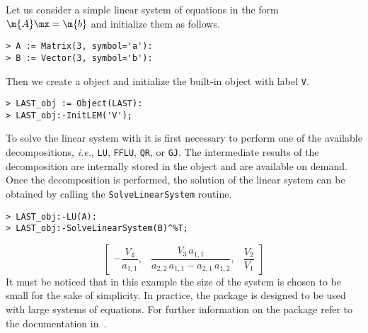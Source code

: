 Let us consider a simple linear system of equations in the form $\m{A}\mx = \m{b}$ and initialize them as follows.
%
\begin{verbatim}
> A := Matrix(3, symbol='a'):
> B := Vector(3, symbol='b'):
\end{verbatim}
%
Then we create a \LAST{} object and initialize the built-in \LEM{} object with label \texttt{V}.
%
\begin{verbatim}
> LAST_obj := Object(LAST):
> LAST_obj:-InitLEM('V');
\end{verbatim}
%
To solve the linear system with \LAST{} it is first necessary to perform one of the available decompositions, \emph{i.e.}, \texttt{LU}, \texttt{FFLU}, \texttt{QR}, or \texttt{GJ}. The intermediate results of the decomposition are internally stored in the \LAST{} object and are available on demand. Once the decomposition is performed, the solution of the linear system can be obtained by calling the \texttt{SolveLinearSystem} routine.
%
\begin{verbatim}
> LAST_obj:-LU(A):
> LAST_obj:-SolveLinearSystem(B)^%T;
\end{verbatim}
\begin{equation*}
    \begin{bmatrix}
        -\dfrac{V_{4}}{a_{1,1}}, &
        \dfrac{V_{3} \, a_{1,1}}{a_{2,2} \, a_{1,1}-a_{2,1} \, a_{1,2}}, &
        \dfrac{V_{2}}{V_{1}}
    \end{bmatrix}
\end{equation*}
%
It must be noticed that in this example the size of the system is chosen to be small for the sake of simplicity. In practice, the \LAST{} package is designed to be used with large systems of equations. For further information on the \LAST{} package refer to the documentation in~\cite{last}.
